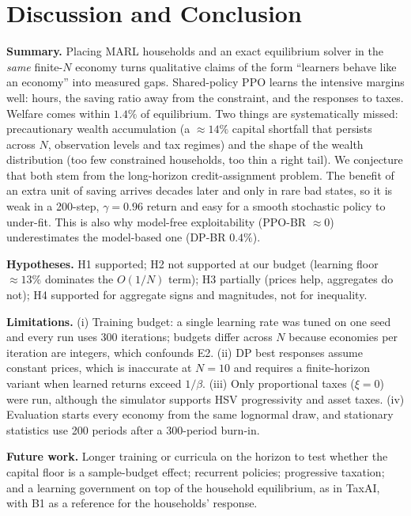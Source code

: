 \section{Discussion and Conclusion}
\textbf{Summary.} Placing MARL households and an exact equilibrium solver in the \emph{same} finite-$N$ economy turns
qualitative claims of the form ``learners behave like an economy'' into measured gaps. Shared-policy PPO learns the
intensive margins well: hours, the saving ratio away from the constraint, and the responses to taxes. Welfare comes
within $1.4\%$ of equilibrium. Two things are systematically missed: precautionary wealth accumulation (a
${\approx}14\%$ capital shortfall that persists across $N$, observation levels and tax regimes) and the shape of the
wealth distribution (too few constrained households, too thin a right tail). We conjecture that both stem from the long-horizon
credit-assignment problem. The benefit of an extra unit of saving arrives decades later and only in rare bad states,
so it is weak in a 200-step, $\gamma=0.96$ return and easy for a smooth stochastic policy to under-fit. This is also why
model-free exploitability (PPO-BR $\approx0$) underestimates the model-based one (DP-BR $0.4\%$).

\textbf{Hypotheses.} H1 supported; H2 not supported at our budget (learning floor ${\approx}13\%$ dominates the
$O(1/N)$ term); H3 partially (prices help, aggregates do not); H4 supported for aggregate signs and magnitudes, not for
inequality.

\textbf{Limitations.} (i) Training budget: a single learning rate was tuned on one seed and every run uses 300 iterations;
budgets differ across $N$ because economies per iteration are integers, which confounds E2. (ii) DP best responses
assume constant prices, which is inaccurate at $N=10$ and requires a finite-horizon variant when learned returns
exceed $1/\beta$. (iii) Only proportional taxes ($\xi=0$) were run, although the simulator supports HSV progressivity
and asset taxes. (iv) Evaluation starts every economy from the same lognormal draw, and stationary statistics use 200
periods after a 300-period burn-in.

\textbf{Future work.} Longer training or curricula on the horizon to test whether the capital floor is a sample-budget
effect; recurrent policies; progressive taxation; and a learning government on top of the household equilibrium, as in
TaxAI, with B1 as a reference for the households' response.
